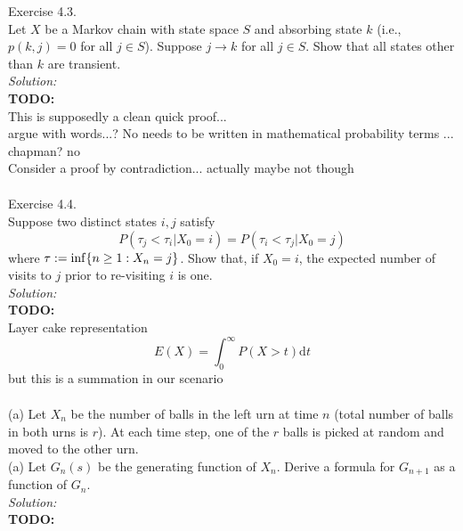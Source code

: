 \documentclass[10pt]{amsart}
\newcommand{\D}{\mathrm{d}}
\begin{document}
\newpage


 Exercise 4.3. \\
Let $X$ be a Markov chain with state space $S$ and absorbing state $k$ (i.e., $p(k, j) = 0$ for all $j \in S$).
Suppose $j \rightarrow k$ for all $j \in S$.
Show that all states other than $k$ are transient. \\

\noindent
\textit{Solution:} \\
\textbf{TODO:} \\
This is supposedly a clean quick proof... \\
argue with words...? No needs to be written in mathematical probability terms ... \\
chapman? no \\
Consider a proof by contradiction... actually maybe not though
\begin{align*}
\end{align*}

\newpage


  Exercise 4.4. \\
Suppose two distinct states $i, j$ satisfy
$$
P(\tau_j < \tau_i | X_0 = i) = P(\tau_i < \tau_j | X_0 = j)
$$
where $\tau := {\rm inf}\{n \geq 1: X_n = j\}$.
Show that, if $X_0 = i$, the expected number of visits to $j$ prior to re-visiting $i$ is one. \\

\noindent
\textit{Solution:} \\
\textbf{TODO:} \\
Layer cake representation 
$$
E(X) = \int_0^\infty P(X > t) \D t
$$
but this is a summation in our scenario
\begin{align*}
\end{align*}

\newpage


 (a) Let $X_n$ be the number of balls in the left urn at time $n$ (total number of balls in both urns is $r$). At each time step, one of the $r$ balls is picked at random and moved to the other urn. \\

\noindent
(a) Let $G_n(s)$ be the generating function of $X_n$. Derive a formula for $G_{n+1}$ as a function of $G_n$. \\

\noindent
\textit{Solution:} \\
\textbf{TODO:} \\
\begin{align*}
\end{align*}
\end{document}

